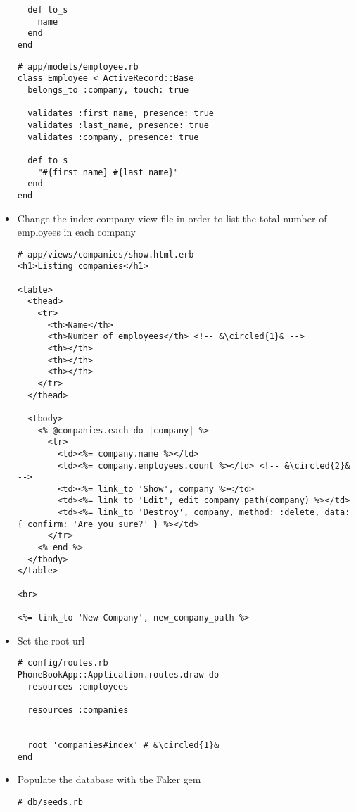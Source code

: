 \documentclass{beamer}
\newcommand*\circled[1]{\tikz[baseline=(char.base)]{
            \node[shape=circle,draw,inner sep=2pt] (char) {#1};}}
\begin{document}
\begin{frame}
\begin{itemize}
\begin{lstlisting}
  def to_s
    name
  end
end
\end{lstlisting}

\lstset{language=Ruby, style=eclipse}
\begin{lstlisting}
# app/models/employee.rb
class Employee < ActiveRecord::Base
  belongs_to :company, touch: true

  validates :first_name, presence: true
  validates :last_name, presence: true
  validates :company, presence: true

  def to_s
    "#{first_name} #{last_name}"
  end
end
\end{lstlisting}
 
\item Change the index company view file in order to list the total number of employees in each company
\lstset{language=Ruby, style=eclipse}
\begin{lstlisting}[escapechar=&]
# app/views/companies/show.html.erb
<h1>Listing companies</h1>

<table>
  <thead>
    <tr>
      <th>Name</th>
      <th>Number of employees</th> <!-- &\circled{1}& -->
      <th></th>
      <th></th>
      <th></th>
    </tr>
  </thead>

  <tbody>
    <% @companies.each do |company| %>
      <tr>
        <td><%= company.name %></td>
        <td><%= company.employees.count %></td> <!-- &\circled{2}& -->
        <td><%= link_to 'Show', company %></td>
        <td><%= link_to 'Edit', edit_company_path(company) %></td>
        <td><%= link_to 'Destroy', company, method: :delete, data: { confirm: 'Are you sure?' } %></td>
      </tr>
    <% end %>
  </tbody>
</table>

<br>

<%= link_to 'New Company', new_company_path %>

\end{lstlisting}

\item Set the root url
\lstset{language=Ruby, style=eclipse}
\begin{lstlisting}[escapechar=&]
# config/routes.rb
PhoneBookApp::Application.routes.draw do
  resources :employees

  resources :companies


  root 'companies#index' # &\circled{1}&
end
\end{lstlisting}

\item Populate the database with the Faker gem
\lstset{language=Ruby, style=eclipse}
\begin{lstlisting}[escapechar=&]
# db/seeds.rb


\end{lstlisting}
\end{itemize}
\end{frame}
\end{document}
